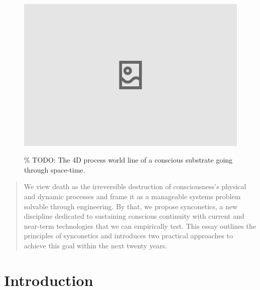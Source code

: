\documentclass[10pt]{article}
\begin{document}
\begin{sloppypar}

  \begin{figure}[ht]
    \centering
    \includegraphics[width=\textwidth]{figures/cover.png}
    \label{fig:cover}
    \caption{\% TODO: The 4D process world line of a conscious substrate going through space-time.}
  \end{figure}
  \newpage



  \begin{abstract}
    We view death as the irreversible destruction of consciousness’s physical and dynamic processes and frame it as a manageable systems problem solvable through engineering. By that, we propose synconetics, a new discipline dedicated to sustaining conscious continuity with current and near-term technologies that we can empirically test. This essay outlines the principles of synconetics and introduces two practical approaches to achieve this goal within the next twenty years.
  \end{abstract}

  \pagebreak
  \tableofcontents
  \pagebreak
  \listoffigures
  \pagebreak


  \section{Introduction}
  \label{sec:introduction}


\end{sloppypar}
\end{document}
